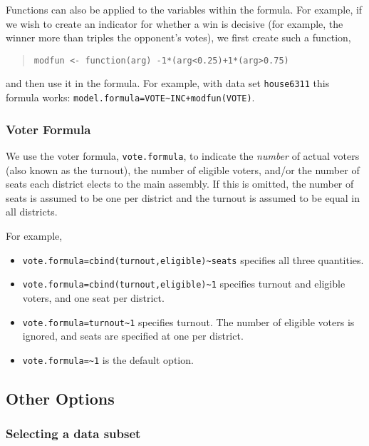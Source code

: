 \documentclass[oneside,letterpaper,titlepage]{article}
\begin{document}
Functions can also be applied to the variables within the formula.
For example, if we wish to create an indicator for whether a win is
decisive (for example, the winner more than triples the opponent's
votes), we first create such a function,

\begin{quote}
\texttt{modfun <- function(arg) -1*(arg<0.25)+1*(arg>0.75)}
\end{quote}

and then use it in the formula.  For example, with data set \texttt{house6311}
this formula works: \texttt{model.formula=VOTE\~{}INC+modfun(VOTE)}.

\subsubsection*{Voter Formula}

We use the voter formula, \texttt{vote.formula}, to indicate the
\emph{number} of actual voters (also known as the turnout), the number of
eligible voters, and/or the number of seats each district elects to
the main assembly. If this is omitted, the number of seats is assumed
to be one per district and the turnout is assumed to be equal in all
districts.

For example,
\begin{itemize}
\item \texttt{vote.formula=cbind(turnout,eligible)\~{}seats} specifies all
  three quantities.

\item \texttt{vote.formula=cbind(turnout,eligible)\~{}1} specifies turnout
  and eligible voters, and one seat per district.

\item \texttt{vote.formula=turnout\~{}1} specifies turnout. The number of
  eligible voters is ignored, and seats are specified at one per
  district.

\item \texttt{vote.formula=\~{}1} is the default option.
\end{itemize}

\subsection{Other Options}

\subsubsection{Selecting a data subset}
\end{document}
